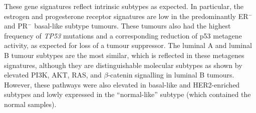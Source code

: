 These gene signatures reflect \glspl{intrinsic subtype} as expected. In particular, the estrogen and progesterone receptor signatures are low in the predominantly \gls{ER}$^-$ and \gls{PR}$^-$ basal-like subtype tumours. These tumours also had the highest frequency of \textit{TP53} \glspl{mutation} and a corresponding reduction of p53 \gls{metagene} activity, as expected for loss of a \gls{tumour suppressor}. The luminal A and luminal B tumour subtypes are the most similar, which is reflected in these \glspl{metagene} signatures, although they are distinguishable molecular subtypes as shown by elevated PI3K, AKT, RAS, and $\beta$-catenin signalling in luminal B tumours. However, these \glspl{pathway} were also elevated in basal-like and HER2-enriched subtypes and lowly expressed in the ``normal-like'' subtype (which contained the normal samples). %


